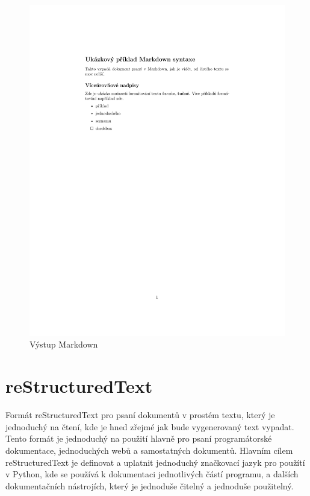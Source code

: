 \begin{figure}[h]
    \includegraphics[height=\textheight]{example.pdf}
    \caption{Výstup Markdown}
    \label{fig:markdown}
\end{figure}

\section{reStructuredText}

Formát reStructuredText pro psaní dokumentů v prostém textu, který je jednoduchý na čtení, kde je hned zřejmé jak bude vygenerovaný text vypadat.
Tento formát je jednoduchý na použití hlavně pro psaní programátorské dokumentace, jednoduchých webů a samostatných dokumentů.
Hlavním cílem reStructuredText je definovat a uplatnit jednoduchý značkovací jazyk pro použítí v Python, kde se používá k dokumentaci jednotlivých částí programu,
a dalších dokumentačních nástrojích, který je jednoduše čitelný a jednoduše použitelný. \cite{reStruDoc}

